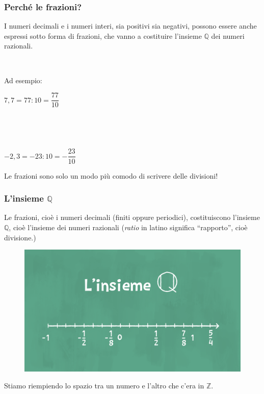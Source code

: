 \documentclass[]{beamer}
\theoremstyle{plain}
\begin{document}
\begin{frame}
\frametitle{Perché le frazioni?}
I numeri decimali e i numeri interi, sia positivi sia negativi, possono essere anche espressi sotto forma di \alert{frazioni}, che vanno a costituire l'insieme $ \mathbb{Q} $ dei \alert{numeri razionali}.\pause

~

Ad esempio:
\begin{center}
  $ 7,7 = 77 : 10 = \dfrac{77}{10} $\pause
  
  ~

  ~

  $ -2,3 = -23 : 10 = -\dfrac{23}{10} $
\end{center}\pause

Le frazioni sono solo un modo più comodo di scrivere delle divisioni!
\end{frame}




\begin{frame}
\frametitle{L'insieme $ \mathbb{Q} $}
Le frazioni, cioè i numeri decimali (finiti oppure periodici), costituiscono l'insieme $ \mathbb{Q} $, cioè l'insieme dei \alert{numeri razionali} (\emph{ratio} in latino significa ``rapporto'', cioè divisione.)
  
\begin{figure}
  \includegraphics[width=.65\columnwidth]{img/rettaq.png}
\end{figure}\pause

Stiamo riempiendo lo spazio tra un numero e l'altro che c'era in $ \mathbb{Z} $.
\end{frame}
\end{document}
